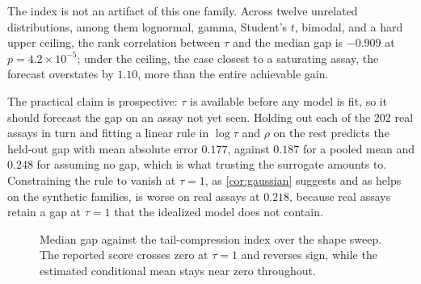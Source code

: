 \documentclass{article}
\theoremstyle{plain}
\theoremstyle{definition}
\begin{document}
The index is not an artifact of this one family. Across twelve unrelated
distributions, among them lognormal, gamma, Student's $t$, bimodal, and a hard upper
ceiling, the rank correlation between $\tau$ and the median gap is $-0.909$ at
$p = 4.2 \times 10^{-5}$; under the ceiling, the case closest to a saturating assay,
the forecast overstates by $1.10$, more than the entire achievable gain.

The practical claim is prospective: $\tau$ is available before any model is fit, so it
should forecast the gap on an assay not yet seen. Holding out each of the $202$ real
assays in turn and fitting a linear rule in $\log \tau$ and $\rho$ on the rest predicts
the held-out gap with mean absolute error $0.177$, against $0.187$ for a pooled mean
and $0.248$ for assuming no gap, which is what trusting the surrogate amounts to.
Constraining the rule to vanish at $\tau = 1$, as \cref{cor:gaussian} suggests and as
helps on the synthetic families, is worse on real assays at $0.218$, because real
assays retain a gap at $\tau = 1$ that the idealized model does not contain.

\begin{figure}[t]
\vskip 0.1in
\begin{center}
\end{center}
\caption{Median gap against the tail-compression index over the shape sweep. The
reported score crosses zero at $\tau = 1$ and reverses sign, while the estimated
conditional mean stays near zero throughout.}
\label{fig:synth}
\vskip -0.15in
\end{figure}
\end{document}
